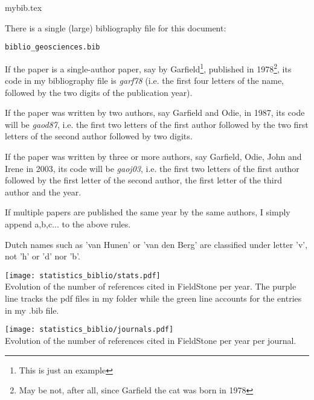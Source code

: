 \begin{flushright} {\tiny {\color{gray} mybib.tex}} \end{flushright}

There is a single (large) bibliography file for this document:
\begin{center}
{\tt biblio\_geosciences.bib}
\end{center}

If the paper is a single-author paper, say by Garfield\footnote{This is just an example}, 
published in 1978\footnote{May be not, after all, since Garfield the cat was born in 1978}, its code 
in my bibliography file is {\sl garf78} (i.e. the first four letters of the name, followed by 
the two digits of the publication year).

If the paper was written by two authors, say Garfield and Odie, in 1987, its code 
will be {\sl gaod87}, i.e. the first two letters of the first author followed by the two 
first letters of the second author followed by two digits.

If the paper was written by three or more authors, say Garfield, Odie, John and Irene in 
2003, its code will be {\sl gaoj03}, i.e. the first two letters of the first author followed 
by the first letter of the second author, the first letter of the third author and the year.

If multiple papers are published the same year by the same authors, I simply append a,b,c... to the 
above rules. 

\begin{remark} Dutch names such as 'van Hunen' or 'van den Berg' are classified under letter 'v', 
not 'h' or 'd' nor 'b'. 
\end{remark}

\vspace{1cm}

\begin{center}
\texttt{[image: statistics\_biblio/stats.pdf]}\\
{\captionfont Evolution of the number of references cited in FieldStone
per year. The purple line tracks the pdf files in my folder while 
the green line accounts for the entries in my .bib file.}
\end{center}

\begin{center}
\texttt{[image: statistics\_biblio/journals.pdf]}\\
{\captionfont Evolution of the number of references cited in FieldStone
per year per journal.}
\end{center}


